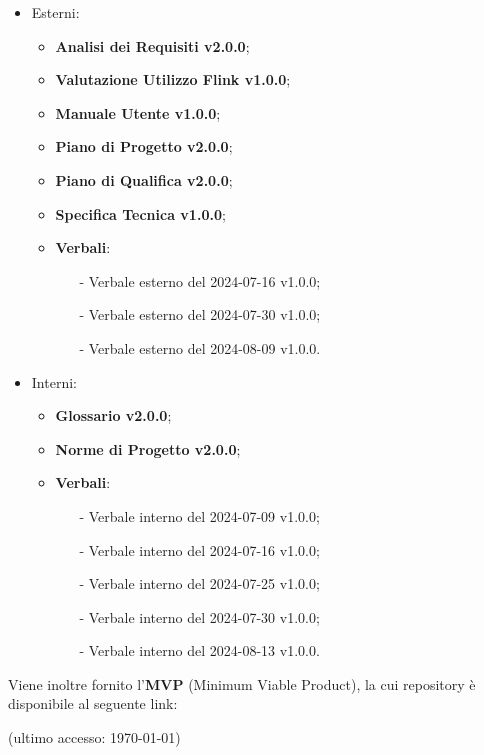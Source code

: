 \documentclass[8pt]{article}
\begin{document}
\begin{itemize}
    \item Esterni:
\begin{itemize}
    \item \textbf{Analisi dei Requisiti v2.0.0};
    \item \textbf{Valutazione Utilizzo Flink v1.0.0};
    \item \textbf{Manuale Utente v1.0.0};
    \item \textbf{Piano di Progetto v2.0.0};
    \item \textbf{Piano di Qualifica v2.0.0};
    \item \textbf{Specifica Tecnica v1.0.0};
    \item \textbf{Verbali}:
    \begin{itemize}
			\item[-] Verbale esterno del 2024-07-16 v1.0.0;
			\item[-] Verbale esterno del 2024-07-30 v1.0.0;
			\item[-] Verbale esterno del 2024-08-09 v1.0.0.
    \end{itemize}
\end{itemize}
    \item Interni:
\begin{itemize}
    \item \textbf{Glossario v2.0.0};
    \item \textbf{Norme di Progetto v2.0.0};
    \item \textbf{Verbali}:
    \begin{itemize}
			\item[-] Verbale interno del 2024-07-09 v1.0.0;
			\item[-] Verbale interno del 2024-07-16 v1.0.0;
			\item[-] Verbale interno del 2024-07-25 v1.0.0;	
			\item[-] Verbale interno del 2024-07-30 v1.0.0;
			\item[-] Verbale interno del 2024-08-13 v1.0.0.
    \end{itemize}
\end{itemize}
\end{itemize}
\vspace{1em}
Viene inoltre fornito  l'\textbf{MVP} (Minimum Viable Product), la cui repository è disponibile al seguente link:
\begin{center}
	\textbf{\href{https://github.com/NaN1fy/SyncCity}{\color{myblue}{https://github.com/NaN1fy/SyncCity}}
    } (ultimo accesso: \today)
\end{center}
\end{document}
